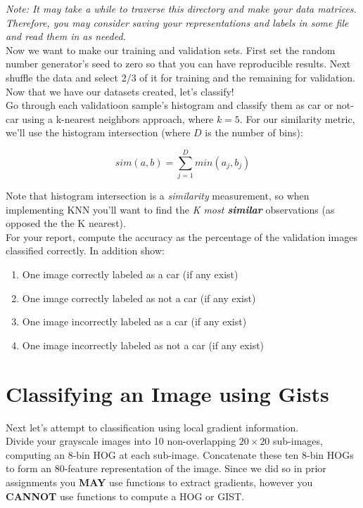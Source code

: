 \documentclass[12pt]{article}
\begin{document}
\noindent
\emph{Note:  It may take a while to traverse this directory and make your data matrices.  Therefore, you may consider saving your representations and labels in some file and read them in as needed.}\\

\noindent
Now we want to make our training and validation sets.  First set the random number generator’s seed to zero so that you can have reproducible results.  Next shuffle the data and select 2/3 of it for training and the remaining for validation.\\

\noindent
Now that we have our datasets created, let’s classify!\\

\noindent
Go through each validatioon sample's histogram and classify them as car or not-car using a k-nearest neighbors approach, where $k=5$.  For our similarity metric, we’ll use the histogram intersection (where $D$ is the number of bins):

$$sim(a,b)=\sum_{j=1}^{D} min(a_j,b_j )$$

\noindent
Note that histogram intersection is a \emph{similarity} measurement, so when implementing KNN you'll want to find the \emph{K most \textbf{similar}} observations (as opposed the the K nearest).\\

\noindent
For your report, compute the accuracy as the percentage of the validation images classified correctly.  In addition show:

\begin{enumerate}
\item One image correctly labeled as a car (if any exist)
\item One image correctly labeled as not a car (if any exist)
\item One image incorrectly labeled as a car (if any exist)
\item One image incorrectly labeled as not a car (if any exist)
\end{enumerate}

\newpage

\section{Classifying an Image using Gists}
Next let’s attempt to classification using local gradient information.\\

\noindent
Divide your grayscale images into 10 non-overlapping $20\times 20$ sub-images, computing an 8-bin HOG at each sub-image.  Concatenate these ten 8-bin HOGs to form an 80-feature representation of the image.  Since we did so in prior assignments you \textbf{MAY} use functions to extract gradients, however you \textbf{CANNOT} use functions to compute a HOG or GIST.\\
\end{document}
